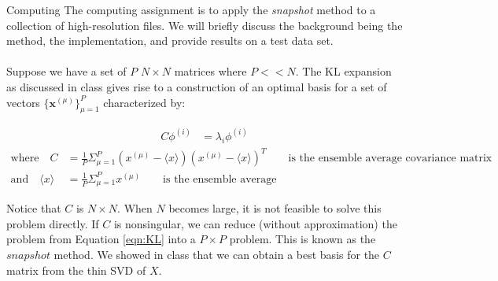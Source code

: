 \newpage
\begin{section}{Computing}
The computing assignment is to apply the \textit{snapshot} method to a collection of high-resolution files. We will briefly discuss the background being the method, the implementation, and provide results on a test data set.
\\
\\
Suppose we have a set of $P$ $N \times N$ matrices where $P << N$. The KL expansion as discussed in class gives rise to a construction of an optimal basis for a set of vectors $\lbrace{\bm{x}^{(\mu)}} \rbrace_{\mu=1}^P$ characterized by:

\begin{align}
	C \phi^{(i)} &= \lambda_i \phi^{(i)} \label{eqn:KL}
\end{align}
\begin{align*}
	\text{where} \quad C &= \frac{1}{P} \Sigma_{\mu=1}^P (x^{(\mu)} - \langle x \rangle )(x^{(\mu)} - \langle x \rangle )^T \qquad \text{is the ensemble average covariance matrix} \\
	\text{and} \quad \langle x \rangle &= \frac{1}{P} \Sigma_{\mu=1}^P x^{(\mu)} \qquad \text{is the ensemble average}
\end{align*}

Notice that $C$ is $N \times N$. When $N$ becomes large, it is not feasible to solve this problem directly. If $C$ is nonsingular, we can reduce (without approximation) the problem from Equation \ref{eqn:KL} into a $P \times P$ problem. This is known as the $snapshot$ method. We showed in class that we can obtain a best basis for the $C$ matrix from the thin SVD of $X$.

\vspace{10pt}

\end{section}
